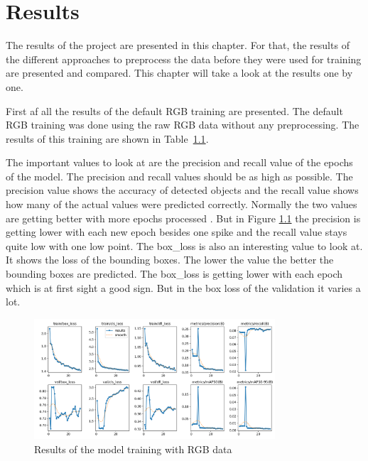 \chapter{Results}
\label{ch:results}


The results of the project are presented in this chapter. For that, the results of the different approaches to preprocess the data before they were used for training are presented and compared. This chapter will take a look at the results one by one.

First af all the results of the default RGB training are presented. The default RGB training was done using the raw RGB data without any preprocessing. The results of this training are shown in Table~\ref{fig:results_rgb}.

The important values to look at are the precision and recall value of the epochs of the model. The precision and recall values should be as high as possible. The precision value shows the accuracy of detected objects and the recall value shows how many of the actual values were predicted correctly. Normally the two values are getting better with more epochs processed \citep{ultralyticsYOLOPerformance}. But in Figure \ref{fig:results_rgb} the precision is getting lower with each new epoch besides one spike and the recall value stays quite low with one low point.
The box\_loss is also an interesting value to look at. It shows the loss of the bounding boxes. The lower the value the better the bounding boxes are predicted. The box\_loss is getting lower with each epoch which is at first sight a good sign. But in the box loss of the validation it varies a lot.

\begin{figure}[htbp] 
    \centering
    \includegraphics[width=0.8\textwidth]{images/results/rgb_results.png}
    \caption{Results of the model training with RGB data}
    \label{fig:results_rgb}
\end{figure}


